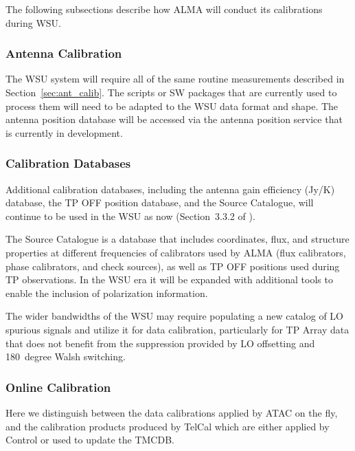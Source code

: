 The following subsections describe how ALMA will conduct its calibrations during WSU. 


\subsubsection{Antenna Calibration}  
The WSU system will require all of the same routine measurements
described in Section~\ref{sec:ant_calib}.  The scripts or SW packages that are currently used to process them will 
need to be adapted to the WSU data format and shape.  The antenna position database will be accessed via the antenna position service that is currently in development.


\subsubsection{Calibration Databases} \label{subsec:caldatabase}
Additional calibration databases, including the antenna gain efficiency (Jy/K) database, the TP OFF position database, and the Source Catalogue, will continue to be used in the WSU as now (Section~3.3.2 of \cite{CSA-IA}).

The Source Catalogue is a database that includes coordinates, flux, and structure properties at different frequencies of calibrators used by ALMA (flux calibrators, phase calibrators, and check sources), as well as TP OFF positions used during TP observations. In the WSU era it will be expanded with additional tools to enable the inclusion of polarization information.

The wider bandwidths of the WSU may require populating a new catalog of LO spurious signals and utilize it for data calibration, particularly for TP Array data that does not benefit from the suppression provided by LO offsetting and 180~degree Walsh switching.


\subsubsection{Online Calibration}  %
\label{sec:WSUonlineCalibration}

Here we distinguish between the data calibrations applied by \ac{ATAC} on the fly, and the calibration products produced by TelCal which are either applied by Control or used to update the \ac{TMCDB}.

